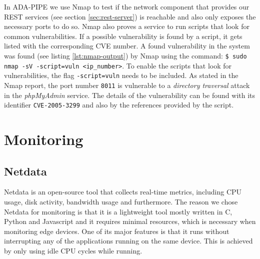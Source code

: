 \documentclass{article}
\begin{document}
                In ADA-PIPE we use Nmap to test if the network component that provides our REST services (see section \ref{sec:rest-server}) is reachable and also only exposes the necessary ports to do so. Nmap also proves a service to run scripts that look for common vulnerabilities. If a possible vulnerability is found by a script, it gets listed with the corresponding CVE number.
                A found vulnerability in the system was found (see listing \ref{lst:nmap-output}) by Nmap using the command: \texttt{\$ sudo nmap -sV -script=vuln <ip\_number>}. To enable the scripts that look for vulnerabilities, the flag \texttt{-script=vuln} needs to be included. 
                As stated in the Nmap report, the port number \texttt{8011} is vulnerable to a \emph{directory traversal} attack in the \emph{phpMyAdmin} \cite{phpmyadminBringingMySQLWeb} service. The details of the vulnerability can be found with its identifier \texttt{CVE-2005-3299} and also by the references provided by the script.
                

                


    \section{Monitoring}
    \label{sec:monitoring}

            
        \subsection{Netdata}
        \label{sec:netdata-monitoring}

            Netdata \cite{netdataGettingStartedLearn2023} is an open-source tool that collects real-time metrics, including CPU usage, disk activity, bandwidth usage and furthermore.
            The reason we chose Netdata for monitoring is that it is a lightweight tool mostly written in C, Python and Javascript and it requires minimal resources, which is necessary when monitoring edge devices.
            One of its major features is that it runs without interrupting any of the applications running on the same device. This is achieved by only using idle CPU cycles while running.
\end{document}
